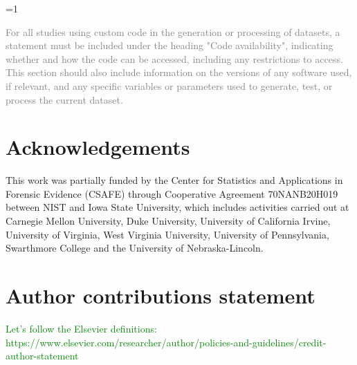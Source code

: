 \documentclass[fleqn,10pt]{wlscirep}
\newcommand{\hh}[1]{{\textcolor{Green}{#1}}}
\newcommand{\ifinstruction}{0} %
\begin{document}
\ifnum \ifinstruction=1

\textcolor{gray}{For all studies using custom code in the generation or processing of datasets, a statement must be included under the heading "Code availability", indicating whether and how the code can be accessed, including any restrictions to access. This section should also include information on the versions of any software used, if relevant, and any specific variables or parameters used to generate, test, or process the current dataset.}
\fi




\section*{Acknowledgements} 
This work was partially funded by the Center for Statistics and
Applications in Forensic Evidence (CSAFE) through Cooperative Agreement
70NANB20H019 between NIST and Iowa State University, which includes
activities carried out at Carnegie Mellon University, Duke University,
University of California Irvine, University of Virginia, West Virginia
University, University of Pennsylvania, Swarthmore College and the
University of Nebraska-Lincoln.

\section*{Author contributions statement}

\hh{Let's follow the Elsevier definitions: https://www.elsevier.com/researcher/author/policies-and-guidelines/credit-author-statement}
\end{document}
